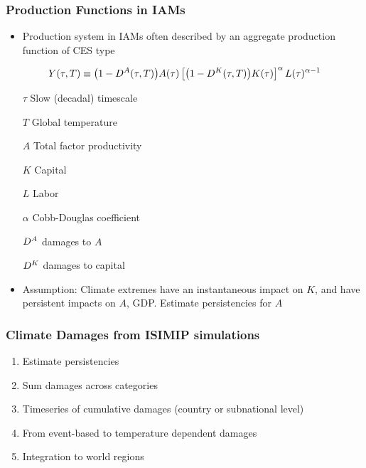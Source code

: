 \documentclass[
c,
11pt,
aspectratio=169, %
final,
]{beamer}
\begin{document}
\begin{frame}
  \frametitle{Production Functions in IAMs}
  \begin{itemize}
  \item  Production system in IAMs often described by an aggregate production function of CES type
  \end{itemize}
  \vfill
  \begin{equation*}
    \label{eq:CD}
    Y(\tau,T)\equiv \big(1-D^A(\tau,T)\big)A(\tau)\left[\big(1-D^K(\tau,T)\big)K(\tau) \right]^\alpha L(\tau)^{\alpha-1}
  \end{equation*}
  \vfill
  \begin{minipage}[l]{.49\linewidth}
   \begin{itemize} 
   \item [$\tau$] Slow (decadal) timescale
   \item [$T$] Global temperature
   \item [$A$] Total factor productivity
   \item [$K$] Capital
   \end{itemize}
 \end{minipage}\hfill
 \begin{minipage}[r]{.49\linewidth}
   \begin{itemize}
   \item [$L$]  Labor
   \item [$\alpha$] Cobb-Douglas coefficient    
   \item [$D^A$]  damages to $A$ 
   \item [$D^K$]  damages to capital
   \end{itemize}
 \end{minipage}
 \vfill
 \begin{itemize}
 \item Assumption: Climate extremes have an instantaneous impact on $K$, and have persistent impacts on $A$, GDP.
   \arrowitem Estimate persistencies for $A$
   \end{itemize}
\end{frame}


\begin{frame}
  \frametitle{Climate Damages from ISIMIP simulations}
  \begin{enumerate}
  \item Estimate persistencies
  \item Sum damages across categories
  \item Timeseries of cumulative damages (country or subnational level)
  \item From event-based to temperature dependent damages
  \item Integration to world regions  
  \end{enumerate}
\end{frame}
\end{document}
